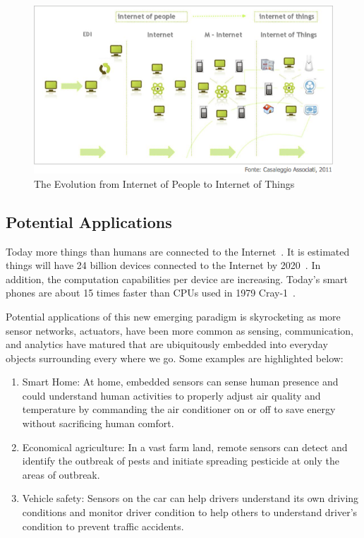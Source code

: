 \begin{figure}[h!]
\centering
    \includegraphics[width=\linewidth]{figures/evolution}
\caption{The Evolution from Internet of People to Internet of Things}
\label{fig:evolution}
\end{figure}


\subsection{Potential Applications}

Today more things than humans are connected to the Internet~\cite{CISCO}. It is
estimated things will have 24 billion devices connected to the Internet by
2020~\cite{Malik}. In addition, the computation capabilities per device are
increasing. Today's smart phones are about 15 times faster than CPUs used in
1979 Cray-1~\cite{Randomly2010}. 

Potential applications of this new emerging paradigm is skyrocketing as more
sensor networks, actuators, have been more common as sensing, communication, and
analytics have matured that are ubiquitously embedded into everyday objects
surrounding every where we go. Some examples are highlighted below:
\begin{enumerate}
\item Smart Home: At home, embedded sensors can sense human presence and could
understand human activities to properly adjust air quality and temperature by
commanding the air conditioner on or off to save energy without sacrificing
human comfort.
\item Economical agriculture: In a vast farm land, remote sensors can detect and
identify the outbreak of pests and initiate spreading pesticide at only the
areas of outbreak.
\item Vehicle safety: Sensors on the car can help drivers understand its own
driving conditions and monitor driver condition to help others to understand
driver's condition to prevent traffic accidents.
\end{enumerate}

